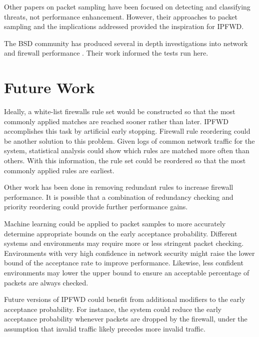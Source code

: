 \documentclass[journal]{IEEEtran}
\begin{document}
  Other papers \cite{exploitingpacketsampling, analysisnetflow,
  monitoringpacketsampling} on packet sampling have been focused on detecting
  and classifying threats, not performance enhancement. However, their
  approaches to packet sampling and the implications addressed provided the
  inspiration for IPFWD. 

  The BSD community has produced several in depth investigations into network
  and firewall performance \cite{ipfwvspf,optimizingfreebsd}. Their work
  informed the tests run here.


\section{Future Work}

  Ideally, a white-list firewalls rule set would be constructed so that the
  most commonly applied matches are reached sooner rather than later. IPFWD
  accomplishes this task by artificial early stopping. Firewall rule reordering
  could be another solution to this problem. Given logs of common network
  traffic for the system, statistical analysis could show which rules are
  matched more often than others. With this information, the rule set could be
  reordered so that the most commonly applied rules are earliest. 

  Other work \cite{redundancydetection} has been done in removing redundant
  rules to increase firewall performance. It is possible that a combination of
  redundancy checking and priority reordering could provide further performance
  gains.

  Machine learning could be applied to packet samples to more accurately
  determine appropriate bounds on the early acceptance probability. Different
  systems and environments may require more or less stringent packet checking.
  Environments with very high confidence in network security might raise the
  lower bound of the acceptance rate to improve performance. Likewise, less
  confident environments may lower the upper bound to ensure an acceptable
  percentage of packets are always checked.

  Future versions of IPFWD could benefit from additional modifiers to the early
  acceptance probability. For instance, the system could reduce the early
  acceptance probability whenever packets are dropped by the firewall, under
  the assumption that invalid traffic likely precedes more invalid traffic.
\end{document}
